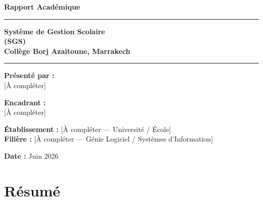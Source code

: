 \documentclass[12pt,a4paper]{report}
\begin{document}
\begin{titlepage}
    \centering
    \vspace*{1cm}

    \textbf{\Large Rapport Académique}

    \vspace{0.5cm}

    \rule{\linewidth}{1pt}
    {\huge\bfseries Système de Gestion Scolaire \\[0.3cm]
    (SGS) \\[0.3cm]
    Collège Borj Azaitoune, Marrakech\par}
    \rule{\linewidth}{1pt}

    \vspace{1.5cm}

    \begin{minipage}[t]{0.45\textwidth}
        \centering
        \textbf{Présenté par :}\\[0.3cm]
        [À compléter]
    \end{minipage}
    \hfill
    \begin{minipage}[t]{0.45\textwidth}
        \centering
        \textbf{Encadrant :}\\[0.3cm]
        [À compléter]
    \end{minipage}

    \vspace{1.5cm}

    \textbf{Établissement :} [À compléter — Université / École]\\
    \textbf{Filière :} [À compléter — Génie Logiciel / Systèmes d'Information]

    \vspace{1cm}

    \textbf{Date :} Juin 2026

    \vfill
\end{titlepage}

\chapter*{Résumé}
\end{document}
